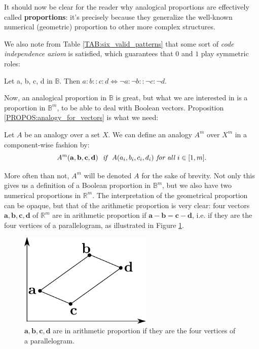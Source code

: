 It should now be clear for the reader why analogical proportions are
effectively called \textbf{proportions}: it's precisely because they generalize
the well-known numerical (geometric) proportion to other more complex
structures.

We also note from Table \ref{TAB:six_valid_patterns} that some sort of {\it
code independence axiom} is satisfied, which guarantees that $0$ and $1$ play
symmetric roles:

\begin{property}
  Let a, b, c, d in $\mathbb{B}$. Then  $a : b :: c : d \iff \neg a :  \neg
  b ::  \neg c :  \neg d.$
\end{property}

Now, an analogical proportion in $\mathbb{B}$ is great, but what we are
interested in is a proportion in $\mathbb{B}^m$, to be able to deal with
Boolean vectors. Proposition \ref{PROPOS:analogy_for_vectors} is what we need:

\begin{proposition}
  \label{PROPOS:analogy_for_vectors}
  Let $A$ be an analogy over a set $X$. We can define an analogy $A^m$
  over $X^m$ in a component-wise fashion by:
  $$A^m(\mathbf{a}, \mathbf{b}, \mathbf{c}, \mathbf{d}) ~ \emph{  if  } ~
  A(a_i, b_i, c_i, d_i) \emph{ for all } i \in [1, m].$$
\end{proposition}
\noindent
More often than not, $A^m$ will be denoted $A$ for the sake of brevity. Not
only this gives us a definition of a Boolean proportion in $\mathbb{B}^m$, but
we also have two numerical proportions in $\mathbb{R}^m$. The interpretation of
the geometrical proportion can be opaque, but that of the arithmetic proportion
is very clear: four vectors $\mathbf{a}, \mathbf{b}, \mathbf{c}, \mathbf{d}$ of
$\mathbb{R}^m$ are in arithmetic proportion if $\mathbf{a} - \mathbf{b} =
\mathbf{c} - \mathbf{d}$, i.e. if they are the four vertices of a
parallelogram, as illustrated in Figure \ref{FIG:arithmetic_proportion}.

\begin{figure}[!h]
\centering
  \includegraphics[width=2.5in]{figures/arithmetic_proportion.pdf}
  \caption{$\mathbf{a}, \mathbf{b}, \mathbf{c}, \mathbf{d}$
  are in arithmetic proportion if they are the four vertices of a
  parallelogram.}
\label{FIG:arithmetic_proportion}
\end{figure}

